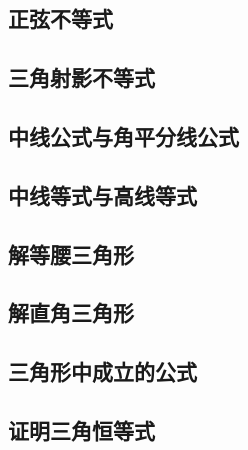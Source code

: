 \documentclass[UTF8]{ctexart}
\begin{document}
\subsection{正弦不等式}
\subsection{三角射影不等式}
\subsection{中线公式与角平分线公式}
\subsection{中线等式与高线等式}
\subsection{解等腰三角形}
\subsection{解直角三角形}
\subsection{三角形中成立的公式}
\subsection{证明三角恒等式}
\end{document}

